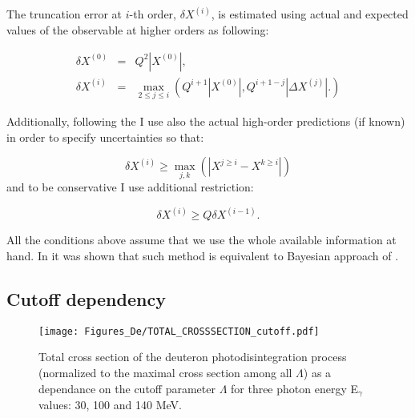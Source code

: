     The truncation error at $i$-th order, $\delta X^{(i)}$, is estimated using
    actual and expected values of the observable at 
    higher orders as following:

    \begin{eqnarray}
        \delta X^{(0)} &=& Q^2 \left| X^{(0)} \right| \label{trunc2},\\ 
        \delta X^{(i)} &=& \max_{2 \leq j \leq i} \left( Q^{i+1} \left| X^{(0)} \right|,
        Q^{i+1-j} \left| \Delta X^{(j)} \right|. \right) \label{trunc3} 
    \end{eqnarray}

    Additionally, following the \cite{Binder2015} I use also the actual high-order predictions 
    (if known) in order to specify uncertainties so that:

    \begin{equation}
        \delta X^{(i)} \geq \max_{j,k} (|X^{j \geq i} - X^{k \geq i}|)
        \label{trunc4}
    \end{equation}
    and to be conservative I use additional restriction:

    \begin{equation}
        \delta X^{(i)} \geq Q \delta X^{(i-1)}.
        \label{trunc5}
    \end{equation}

    All the conditions above assume that we use the whole available information at hand.
    In \cite{Melendez_BayesTrunc}  it was shown that such method is equivalent to Bayesian approach of \cite{Melendez_BayesTrunc}.


    \subsection*{Cutoff dependency}



    \begin{figure}[htb]
        \begin{center}
            \texttt{[image: Figures\_De/TOTAL\_CROSSSECTION\_cutoff.pdf]}
        \end{center}
        \caption{Total cross section of the deuteron photodisintegration
        process (normalized to the maximal cross section among all $\Lambda$)
        as a dependance on the cutoff parameter $\Lambda$ 
        for three photon energy E$_\gamma$ values: 30, 100 and 140 MeV.}
        \label{Cutoff_dep}
        \end{figure}

